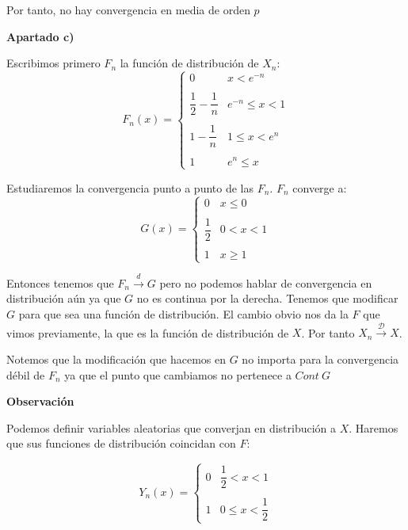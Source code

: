 \documentclass[openany]{book}
\begin{document}
\begin{exercise}
    Por tanto, no hay convergencia en media de orden $ p $

    \begin{flushright}
        \textbf{Apartado c)}
    \end{flushright}
    Escribimos primero $ F_n $ la función de distribución de $ X_n $:
    $$ F_n(x) = \left\{
    \begin{array}{ll}
        0 & x<e^{-n}\\ \\ 
        \dfrac{1}{2}-\dfrac{1}{n} & e^{-n}\leq  x <1\\\\ 
        1-\dfrac{1}{n} & 1\leq x<e^{n}\\\\ 
        1 & e^{n}\leq  x 
    \end{array}
    \right. $$

    Estudiaremos la convergencia punto a punto de las $ F_n $. $ F_n $ converge a:
    $$G(x) =  \left\{
    \begin{array}{ll}
        0 & x\leq  0\\ \\
        \dfrac{1}{2} & 0<x<1\\ \\
        1 & x\geq 1

    \end{array}
    \right. $$

    Entonces tenemos que $ F_n\xrightarrow{d}G $ pero no podemos hablar de convergencia en distribución aún ya que $ G $ no es continua por la derecha. Tenemos que modificar $ G $ para que sea una función de distribución. El cambio obvio nos da la $ F $ que vimos previamente, la que es la función de distribución de $ X $. Por tanto $ X_n \xrightarrow{\mathcal{D}}X $.

    Notemos que la modificación que hacemos en $ G $ no importa para la convergencia débil de $ F_n $ ya que el punto que cambiamos no pertenece a $Cont\ G $


    \textbf{Observación}

    Podemos definir variables aleatorias que converjan en distribución a $ X $. Haremos que sus funciones de distribución coincidan con $ F $:

    $$ Y_n(x) = \left\{
    \begin{array}{ll}
        0 & \dfrac{1}{2} <x<1 \\ \\ 
        1 & 0 \leq x < \dfrac{1}{2}
    \end{array}
    \right. $$


\end{exercise}
\end{document}
